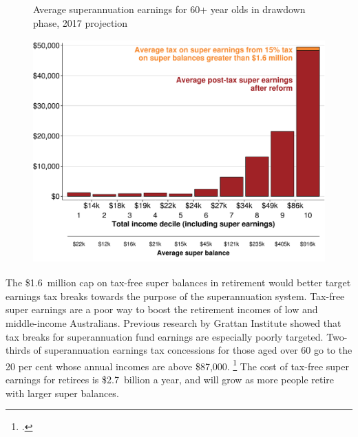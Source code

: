 \documentclass[continuous]{grattan}
\begin{document}
\begin{figure}
%
{Average superannuation earnings for 60+ year olds in drawdown phase, 2017 projection}%

\includegraphics[width=4.47222in,height=3.38973947727273in]{figure/15pc-tax-free-earnings-noQC-1} 

\end{figure}

The \$1.6~million cap on tax-free super balances in retirement would better target earnings tax breaks towards the purpose of the superannuation system.
Tax-free super earnings are a poor way to boost the retirement incomes of low and middle-income Australians.
Previous research by Grattan Institute showed that tax breaks for superannuation fund earnings are especially poorly targeted.
Two-thirds of superannuation earnings tax concessions for those aged over 60 go to the 20 per cent whose annual incomes are above \$87,000.%
\footcite[][60]{DaleyCoatesWoodEtAl2015Super} %
The cost of tax-free super earnings for retirees is \$2.7~billion a year, and will grow as more people retire with larger super balances.
\end{document}
